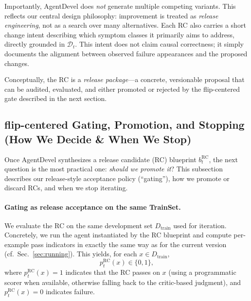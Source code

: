 \documentclass[11pt]{article}
\begin{document}
Importantly, AgentDevel does \emph{not} generate multiple competing variants. This reflects our central design philosophy: improvement is treated as \emph{release engineering}, not as a search over many alternatives. Each RC also carries a short change intent describing which symptom classes it primarily aims to address, directly grounded in $\mathcal{D}_t$. This intent does not claim causal correctness; it simply documents the alignment between observed failure appearances and the proposed changes.

Conceptually, the RC is a \emph{release package}—a concrete, versionable proposal that can be audited, evaluated, and either promoted or rejected by the flip-centered gate described in the next section.

\subsection{flip-centered Gating, Promotion, and Stopping (How We Decide \& When We Stop)}
\label{sec:gating}

Once AgentDevel synthesizes a release candidate (RC) blueprint $b_t^{\mathrm{RC}}$, the next question is the most practical one: \emph{should we promote it}? This subsection describes our release-style acceptance policy (``gating''), how we promote or discard RCs, and when we stop iterating.

\paragraph{Gating as release acceptance on the same TrainSet.}
We evaluate the RC on the same development set $D_{\text{train}}$ used for iteration. Concretely, we run the agent instantiated by the RC blueprint and compute per-example pass indicators in exactly the same way as for the current version (cf.\ Sec.~\ref{sec:running}). This yields, for each $x\in D_{\text{train}}$,
\begin{equation}
p_t^{\mathrm{RC}}(x)\in\{0,1\},
\end{equation}
where $p_t^{\mathrm{RC}}(x)=1$ indicates that the RC passes on $x$ (using a programmatic scorer when available, otherwise falling back to the critic-based judgment), and $p_t^{\mathrm{RC}}(x)=0$ indicates failure.
\end{document}
